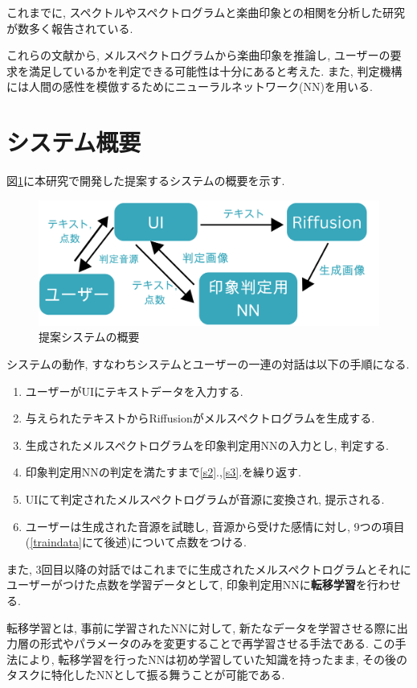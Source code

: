 \documentclass[a4paper,11pt,dvipdfmx]{jreport}
\begin{document}
これまでに, スペクトルやスペクトログラムと楽曲印象との相関を分析した研究が数多く報告されている\cite{Nagoya,Tokyo, Matsue}.

これらの文献から, メルスペクトログラムから楽曲印象を推論し, 
ユーザーの要求を満足しているかを判定できる可能性は十分にあると考えた.
また, 判定機構には人間の感性を模倣するためにニューラルネットワーク(NN)を用いる.

\newpage
\section{システム概要}
図\ref{system}に本研究で開発した提案するシステムの概要を示す.

\begin{figure}[htbp]
  \centering
  \includegraphics[width=\linewidth]{sys.png}
  \caption{提案システムの概要}
  \label{system}
\end{figure}

システムの動作, すなわちシステムとユーザーの一連の対話は以下の手順になる.
\begin{enumerate}
  \item ユーザーがUIにテキストデータを入力する.\label{s1}
  \item 与えられたテキストからRiffusionがメルスペクトログラムを生成する.\label{s2}
  \item 生成されたメルスペクトログラムを印象判定用NNの入力とし, 判定する.\label{s3}
  \item 印象判定用NNの判定を満たすまで\ref{s2}.,\ref{s3}.を繰り返す.
  \item UIにて判定されたメルスペクトログラムが音源に変換され, 提示される.
  \item ユーザーは生成された音源を試聴し, 音源から受けた感情に対し, 9つの項目(\ref{traindata}にて後述)について点数をつける.
\end{enumerate}
また, 3回目以降の対話ではこれまでに生成されたメルスペクトログラムとそれにユーザーがつけた点数を学習データとして,
印象判定用NNに\textbf{転移学習}を行わせる.

転移学習とは, 事前に学習されたNNに対して, 
新たなデータを学習させる際に出力層の形式やパラメータのみを変更することで再学習させる手法である.
この手法により, 転移学習を行ったNNは初め学習していた知識を持ったまま, 
その後のタスクに特化したNNとして振る舞うことが可能である.
\end{document}
